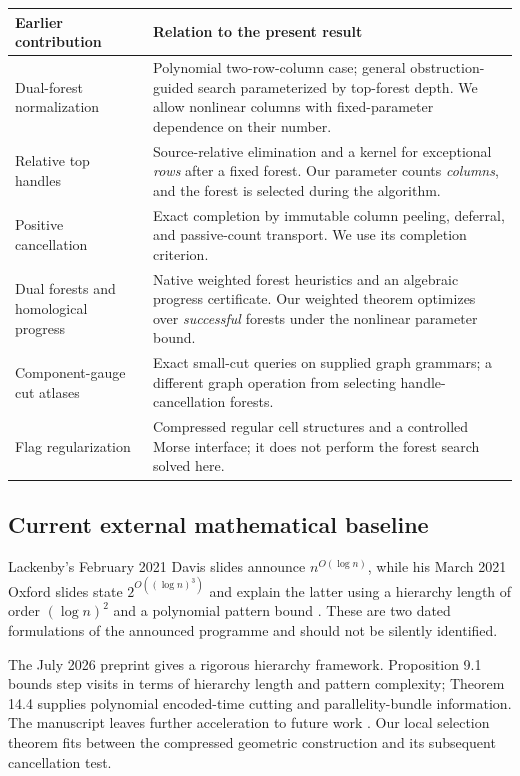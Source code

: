 \begin{center}
\small
\begin{tabularx}{\linewidth}{@{}p{.29\linewidth}X@{}}
\toprule
Earlier contribution & Relation to the present result \\
\midrule
Dual-forest normalization & Polynomial two-row-column case; general
obstruction-guided search parameterized by top-forest depth. We allow
nonlinear columns with fixed-parameter dependence on their number. \\
Relative top handles & Source-relative elimination and a kernel for
exceptional \emph{rows} after a fixed forest. Our parameter counts
\emph{columns}, and the forest is selected during the algorithm. \\
Positive cancellation & Exact completion by immutable column peeling,
deferral, and passive-count transport. We use its completion criterion. \\
Dual forests and homological progress & Native weighted forest heuristics
and an algebraic progress certificate. Our weighted theorem optimizes over
\emph{successful} forests under the nonlinear parameter bound. \\
Component-gauge cut atlases & Exact small-cut queries on supplied graph
grammars; a different graph operation from selecting handle-cancellation
forests. \\
Flag regularization & Compressed regular cell structures and a controlled
Morse interface; it does not perform the forest search solved here. \\
\bottomrule
\end{tabularx}
\end{center}

\subsection{Current external mathematical baseline}

Lackenby's February 2021 Davis slides announce $n^{O(\log n)}$, while his
March 2021 Oxford slides state $2^{O((\log n)^3)}$ and explain the latter
using a hierarchy length of order $(\log n)^2$ and a polynomial pattern
bound \cite{lackenby-davis,lackenby-oxford}. These are two dated formulations
of the announced programme and should not be silently identified.

The July 2026 preprint gives a rigorous hierarchy framework. Proposition
9.1 bounds step visits in terms of hierarchy length and pattern complexity;
Theorem 14.4 supplies polynomial encoded-time cutting and parallelity-bundle
information. The manuscript leaves further acceleration to future work
\cite{lackenby2026}. Our local selection theorem fits between the
compressed geometric construction and its subsequent cancellation test.

